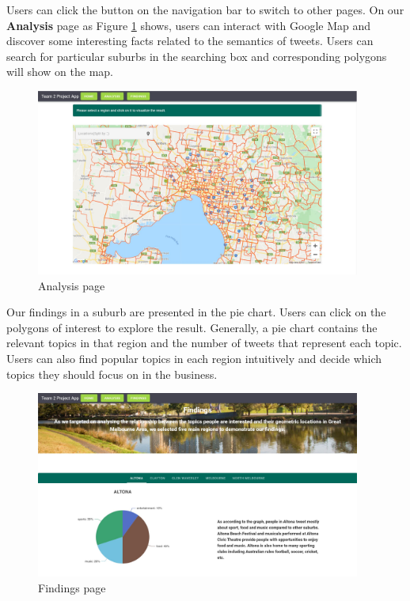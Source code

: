 \documentclass[parskip=full, 11pt]{article}
\begin{document}
Users can click the button on the navigation bar to switch to other pages. On our \textbf{Analysis} page as Figure \ref{fig:analysis_page} shows, users can interact with Google Map and discover some interesting facts related to the semantics of tweets. Users can search for particular suburbs in the searching box and corresponding polygons will show on the map.

\begin{figure}[hp]
    \centering
    \includegraphics[width=0.95\textwidth]{Figures/AnalysisPage.JPG}
    \caption{Analysis page}
    \label{fig:analysis_page}
\end{figure}

Our findings in a suburb are presented in the pie chart. Users can click on the polygons of interest to explore the result. Generally, a pie chart contains the relevant topics in that region and the number of tweets that represent each topic. Users can also find popular topics in each region intuitively and decide which topics they should focus on in the business.

\begin{figure}[hp]
    \centering
    \includegraphics[width=0.95\textwidth]{Figures/FindingPage.JPG}
    \caption{Findings page}
    \label{fig:finding_page}
\end{figure}
\end{document}
